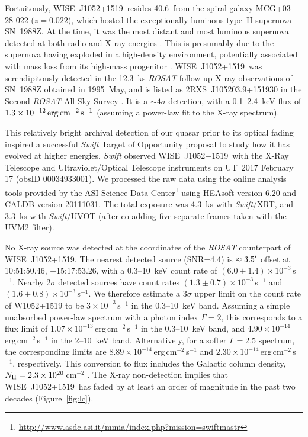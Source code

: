 \documentclass[iop]{emulateapj}
\def\qso{WISE~J1052+1519}
\begin{document}
Fortuitously, \qso\ resides 40.6\arcmin\ from the spiral galaxy
MCG+03-28-022 ($z = 0.022$), which hosted the exceptionally luminous
type~II supernova SN~1988Z.  At the time, it was the most distant
and most luminous supernova detected at both radio \citep[][]{VanDyk:93}
and X-ray energies \citep[][]{Fabian:96}.  This is presumably due
to the supernova having exploded in a high-density environment,
potentially associated with mass loss from its high-mass progenitor
\citep[][]{Stathakis:91}.  \qso\ was serendipitously detected in
the 12.3~ks {\it ROSAT} follow-up X-ray observations of SN~1988Z
obtained in 1995~May, and is listed as 2RXS~J105203.9+151930 in the
Second {\it ROSAT} All-Sky Survey \citep[][]{Boller:16}. It is a
$\sim 4\sigma$ detection, with a 0.1--2.4~keV flux of $1.3 \times
10^{-12}\, {\rm erg}\, {\rm cm}^{-2}\, {\rm s}^{-1}$ (assuming a
power-law fit to the X-ray spectrum).

This relatively bright archival detection of our quasar prior to
its optical fading inspired a successful {\it Swift} Target of
Opportunity proposal to study how it has evolved at higher energies.
{\em Swift} observed \qso\ with the X-Ray Telescope
\citep[XRT;][]{Burrows:05} and Ultraviolet/Optical Telescope
\citep[UVOT;][]{Roming:05} instruments on UT~2017 February 17 (obsID
00034933001).  We processed the raw data using the online analysis
tools provided by the ASI Science Data
Center\footnote{\url{http://www.asdc.asi.it/mmia/index.php?mission=swiftmastr}}
using HEAsoft version 6.20 and CALDB version 20111031.  The total
exposure was 4.3~ks with {\it Swift}/XRT, and 3.3~ks with {\it
Swift}/UVOT (after co-adding five separate frames taken with the
UVM2 filter).

No X-ray source was detected at the coordinates of the {\it ROSAT}
counterpart of \qso. The nearest detected source (SNR=4.4) is $\approx
3.5\mbox{$^\prime$}$ offset at 10:51:50.46, +15:17:53.26, with a 0.3--10~keV
count rate of $(6.0 \pm 1.4)\times 10^{-3}$\,s$^{-1}$.  Nearby
$2 \sigma$ detected sources have count rates $(1.3\pm0.7)\times
10^{-3}$\,s$^{-1}$ and $(1.6\pm0.8)\times10^{-3}$\,s$^{-1}$. We
therefore estimate a $3 \sigma$ upper limit on the count rate of
W1052+1519 to be $3\times 10^{-3}$\,s$^{-1}$ in the 0.3--10~keV
band. Assuming a simple unabsorbed power-law spectrum with a photon
index $\Gamma=2$, this corresponds to a flux limit of $1.07\times
10^{-13}$\,erg\,cm$^{-2}$\,s$^{-1}$ in the 0.3--10~keV band, and
$4.90\times10^{-14}$\,erg\,cm$^{-2}$\,s$^{-1}$ in the 2--10~keV
band. Alternatively, for a softer $\Gamma=2.5$ spectrum, the
corresponding limits are $8.89\times 10^{-14}$\,erg\,cm$^{-2}$\,s$^{-1}$
and $2.30\times 10^{-14}$\,erg\,cm$^{-2}$\,s$^{-1}$, respectively.
This conversion to flux includes the Galactic column density, $N_{\rm
H}=2.3\times 10^{20}$\,cm$^{-2}$ \citep{Kalberla:05}.  The X-ray
non-detection implies that \qso\ has faded by at least an order of
magnitude in the past two decades (Figure~\ref{fig:lc}).
\end{document}
